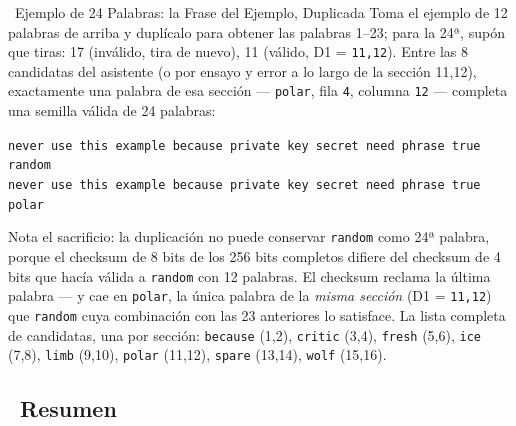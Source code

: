 \documentclass[10pt]{article}
\begin{document}
\begin{examplebox}{\faLightbulb~Ejemplo de 24 Palabras: la Frase del Ejemplo, Duplicada}
Toma el ejemplo de 12 palabras de arriba y duplícalo para obtener las palabras 1--23; para la 24ª, supón que tiras: 17 (inválido, tira de nuevo), 11 (válido, D1 = \texttt{11,12}). Entre las 8 candidatas del asistente (o por ensayo y error a lo largo de la sección 11,12), exactamente una palabra de esa sección --- \texttt{polar}, fila \texttt{4}, columna \texttt{12} --- completa una semilla válida de 24 palabras:

\vspace{0.5em}
\texttt{never use this example because private key secret need phrase true random}\\
\texttt{never use this example because private key secret need phrase true polar}~\faCheckCircle
\vspace{0.5em}

Nota el sacrificio: la duplicación no puede conservar \texttt{random} como 24ª palabra, porque el checksum de 8 bits de los 256 bits completos difiere del checksum de 4 bits que hacía válida a \texttt{random} con 12 palabras. El checksum reclama la última palabra --- y cae en \texttt{polar}, la única palabra de la \emph{misma sección} (D1 = \texttt{11,12}) que \texttt{random} cuya combinación con las 23 anteriores lo satisface. La lista completa de candidatas, una por sección: \texttt{because} (1,2), \texttt{critic} (3,4), \texttt{fresh} (5,6), \texttt{ice} (7,8), \texttt{limb} (9,10), \texttt{polar} (11,12), \texttt{spare} (13,14), \texttt{wolf} (15,16).
\end{examplebox}

\subsection*{\faListOl~Resumen}
\end{document}
